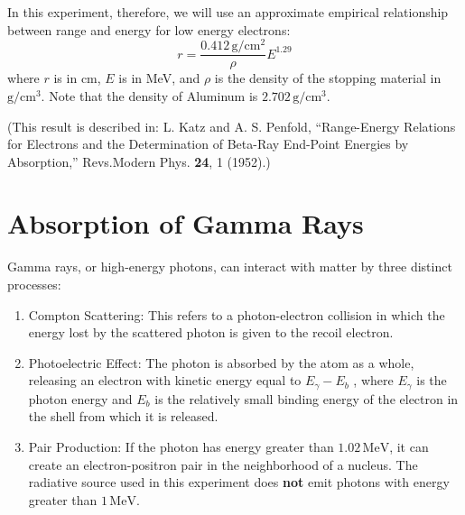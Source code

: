 In this experiment, therefore, we will use an approximate empirical relationship between range and energy for low energy electrons:
\begin{equation}
  r=\frac{0.412\, \mathrm{g}/\mathrm{cm}^2}{\rho}E^{1.29}
\label{eq:re}
\end{equation}
where $r$ is in cm, $E$ is in MeV, and $\rho$ is the density of the stopping material in $\mathrm{g} / \mathrm{cm}^3$. Note that the density of Aluminum is $2.702\,\mathrm{g} /\mathrm{cm}^{3}$.\myskip

(This result is described in: L. Katz and A. S. Penfold, ``Range-Energy Relations for Electrons and the Determination of Beta-Ray End-Point Energies by Absorption,'' Revs.Modern Phys. \textbf{24}, 1 (1952).)

\section{Absorption of Gamma Rays}
Gamma rays, or high-energy photons, can interact with matter by three distinct processes:
\begin{enumerate}[1)]
\item Compton Scattering: This refers to a photon-electron collision in which the energy lost by the scattered photon is given to the recoil electron.
\item Photoelectric Effect: The photon is absorbed by the atom as a whole, releasing an electron with kinetic energy equal to $E_{\gamma} - E_{b}$ , where $E_{\gamma}$ is the photon energy and $E_{b}$ is the relatively small binding energy of the electron in the shell from which it is released.
\item Pair Production: If the photon has energy greater than $1.02\, \mathrm{MeV}$, it can create an electron-positron pair in the neighborhood of a nucleus. The radiative source used in this experiment does \textbf{not} emit photons with energy greater than $1\, \mathrm{MeV}$. 
\end{enumerate}

